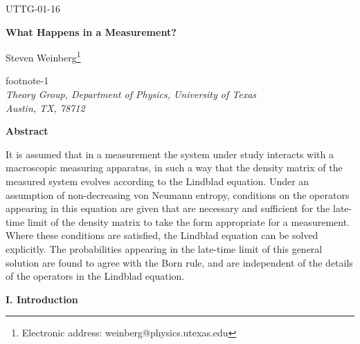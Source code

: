 \documentclass[12pt]{article}
\def\fnote#1#2{\begingroup\def\thefootnote{#1}\footnote{#2}\addtocounter
{footnote}{-1}\endgroup}
\begin{document}
\raggedbottom


\hfill{UTTG-01-16 }


\vspace{36pt}


\begin{center}
{\large {\bf {What Happens in a Measurement?}}}


\vspace{36pt}
Steven Weinberg\fnote{*}{Electronic address:
weinberg@physics.utexas.edu}\\
{\em Theory Group, Department of Physics, University of
Texas\\
Austin, TX, 78712}


\vspace{30pt}

\noindent
{\bf Abstract}
\end{center}

\vspace{10pt}

\noindent
It is assumed that in a measurement the system  under study interacts with a macroscopic measuring apparatus, in such a way that the density matrix of the measured system  evolves according to the Lindblad equation.  Under an assumption of non-decreasing von Neumann entropy, conditions on the operators appearing in this equation are given that are necessary and sufficient for the late-time limit of the density matrix to take the form appropriate for a measurement. Where these conditions are satisfied, the Lindblad equation can be solved explicitly.  The probabilities appearing in the late-time limit of this general solution are found to agree with the Born rule, and are independent of the details of the operators in the Lindblad equation.


\vfill

\pagebreak



\begin{center}
{\bf I. Introduction}
\end{center}		
\end{document}
